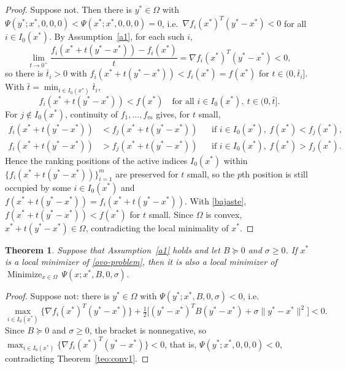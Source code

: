 \documentclass[11pt]{article}
\newcommand{\minimize}{\mathop{\text{Minimize}}}
\newtheorem{theorem}{Theorem}[section]
\begin{document}
\begin{proof}
Suppose not. Then there is $y^* \in \Omega$ with
$\Psi(y^*; x^*, 0, 0, 0) < \Psi(x^*; x^*, 0, 0, 0) = 0$, i.e.\
$\nabla f_i(x^*)^T(y^* - x^*) < 0$ for all $i \in I_0(x^*)$. By
Assumption~\ref{a1}, for each such $i$,
\[
\lim_{t \to 0^+} \frac{f_i(x^* + t(y^* - x^*)) - f_i(x^*)}{t}
= \nabla f_i(x^*)^T(y^* - x^*) < 0,
\]
so there is $\bar{t}_i > 0$ with $f_i(x^* + t(y^* - x^*)) < f_i(x^*) = f(x^*)$
for $t \in (0, \bar{t}_i]$. With $\bar{t} = \min_{i \in I_0(x^*)} \bar{t}_i$,
\begin{equation} \label{bajaste}
f_i(x^* + t(y^* - x^*)) < f(x^*) \quad
\text{for all } i \in I_0(x^*),\ t \in (0, \bar{t}].
\end{equation}
For $j \notin I_0(x^*)$, continuity of $f_1, \ldots, f_m$ gives, for $t$ small,
\begin{align}
f_i(x^* + t(y^* - x^*)) &< f_j(x^* + t(y^* - x^*))
&&\text{if } i \in I_0(x^*),\ f(x^*) < f_j(x^*), \label{arriba}\\
f_i(x^* + t(y^* - x^*)) &> f_j(x^* + t(y^* - x^*))
&&\text{if } i \in I_0(x^*),\ f(x^*) > f_j(x^*). \label{abajo}
\end{align}
Hence the ranking positions of the active indices $I_0(x^*)$ within
$\{f_i(x^* + t(y^* - x^*))\}_{i=1}^m$ are preserved for $t$ small, so the $p$th
position is still occupied by some $i \in I_0(x^*)$ and
$f(x^* + t(y^* - x^*)) = f_i(x^* + t(y^* - x^*))$. With \eqref{bajaste},
$f(x^* + t(y^* - x^*)) < f(x^*)$ for $t$ small. Since $\Omega$ is convex,
$x^* + t(y^* - x^*) \in \Omega$, contradicting the local minimality of $x^*$.
\end{proof}

\begin{theorem} \label{teo:conv2}
Suppose that Assumption~\ref{a1} holds and let $B \succeq 0$ and $\sigma \geq 0$.
If $x^*$ is a local minimizer of \eqref{ovo-problem}, then it is also a local
minimizer of $\minimize_{x \in \Omega}\, \Psi(x; x^*, B, 0, \sigma)$.
\end{theorem}

\begin{proof}
Suppose not: there is $y^* \in \Omega$ with $\Psi(y^*; x^*, B, 0, \sigma) < 0$,
i.e.
\[
\max_{i \in I_0(x^*)} \{ \nabla f_i(x^*)^T(y^* - x^*) \}
+ \tfrac{1}{2} \big[ (y^* - x^*)^T B (y^* - x^*) + \sigma \|y^* - x^*\|^2 \big]
< 0.
\]
Since $B \succeq 0$ and $\sigma \geq 0$, the bracket is nonnegative, so
$\max_{i \in I_0(x^*)} \{ \nabla f_i(x^*)^T(y^* - x^*) \} < 0$, that is,
$\Psi(y^*; x^*, 0, 0, 0) < 0$, contradicting Theorem~\ref{teo:conv1}.
\end{proof}
\end{document}
